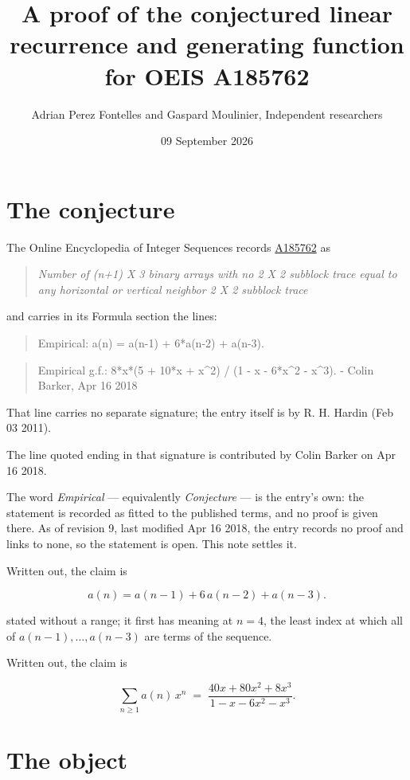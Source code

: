 \documentclass[11pt]{article}
\title{A proof of the conjectured linear recurrence and generating function for OEIS A185762}
\author{Adrian Perez Fontelles and Gaspard Moulinier, Independent researchers}
\date{09 September 2026}
\theoremstyle{definition}
\begin{document}
\maketitle
\section{The conjecture}

The Online Encyclopedia of Integer Sequences records \href{https://oeis.org/A185762}{A185762} as

\begin{quote}\itshape Number of (n+1) X 3 binary arrays with no 2 X 2 subblock trace equal to any horizontal or vertical neighbor 2 X 2 subblock trace\end{quote}

and carries in its Formula section the lines:

\begin{quote}\ttfamily Empirical: a(n) = a(n-1) + 6*a(n-2) + a(n-3).\end{quote}

\begin{quote}\ttfamily Empirical g.f.: 8*x*(5 + 10*x + x\textasciicircum{}2) / (1 - x - 6*x\textasciicircum{}2 - x\textasciicircum{}3). - Colin Barker, Apr 16 2018\end{quote}

That line carries no separate signature; the entry itself is by R. H. Hardin (Feb 03 2011).

The line quoted ending in that signature is contributed by Colin Barker on Apr 16 2018.

The word {\itshape Empirical} --- equivalently {\itshape Conjecture} --- is the entry's own: the statement is recorded as fitted to the published terms, and no proof is given there. As of revision 9, last modified Apr 16 2018, the entry records no proof and links to none, so the statement is open. This note settles it.

Written out, the claim is

\[a(n) = a(n-1) + 6\,a(n-2) + a(n-3).\]

stated without a range; it first has meaning at $n = 4$, the least index at which all of $a(n-1),\dots,a(n-3)$ are terms of the sequence.

Written out, the claim is

\[\sum_{n \ge 1} a(n)\,x^n \;=\; \frac{40x + 80x^{2} + 8x^{3}}{1 - x - 6x^{2} - x^{3}}.\]

\section{The object}
\end{document}
